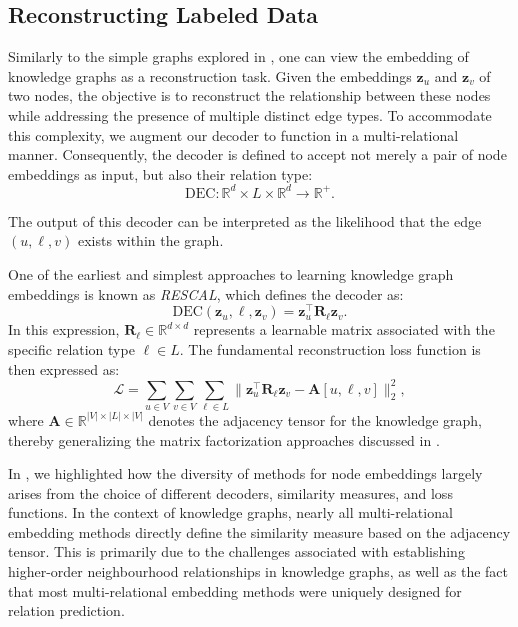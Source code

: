 \subsection{Reconstructing Labeled Data}
Similarly to the simple graphs explored in , one can view the embedding of knowledge graphs as a reconstruction task. Given the embeddings $ \mathbf{z}_u $ and $ \mathbf{z}_v $ of two nodes, the objective is to reconstruct the relationship between these nodes while addressing the presence of multiple distinct edge types. To accommodate this complexity, we augment our decoder to function in a multi-relational manner. Consequently, the decoder is defined to accept not merely a pair of node embeddings as input, but also their relation type:
\begin{equation*}
    \text{DEC}: \mathbb{R}^d \times L \times \mathbb{R}^d \to \mathbb{R}^+.
\end{equation*}

The output of this decoder can be interpreted as the likelihood that the edge $ (u,\ell,v) $ exists within the graph.

One of the earliest and simplest approaches to learning knowledge graph embeddings is known as \textit{RESCAL}, which defines the decoder as:
\begin{equation}\label{eq:RESCAL}
    \text{DEC}(\mathbf{z}_u, \ell, \mathbf{z}_v) = \mathbf{z}_u^\top \mathbf{R}_\ell \mathbf{z}_v.
\end{equation}
In this expression, $ \mathbf{R}_\ell\in \mathbb{R}^{d\times d} $ represents a learnable matrix associated with the specific relation type $ \ell\in L $. The fundamental reconstruction loss function is then expressed as:
\begin{equation}\label{eq:reconstructionLossMulti}
    \mathcal{L} = \sum_{u\in V}\sum_{v\in V}\sum_{\ell\in L} \|\mathbf{z}_u^\top \mathbf{R}_\ell \mathbf{z}_v - \mathbf{A}[u,\ell,v]\|_2^2,
\end{equation}
where $ \mathbf{A}\in\mathbb{R}^{|V|\times|L|\times|V|} $ denotes the adjacency tensor for the knowledge graph, thereby generalizing the matrix factorization approaches discussed in .

\medskip
In , we highlighted how the diversity of methods for node embeddings largely arises from the choice of different decoders, similarity measures, and loss functions. In the context of knowledge graphs, nearly all multi-relational embedding methods directly define the similarity measure based on the adjacency tensor. This is primarily due to the challenges associated with establishing higher-order neighbourhood relationships in knowledge graphs, as well as the fact that most multi-relational embedding methods were uniquely designed for relation prediction.

